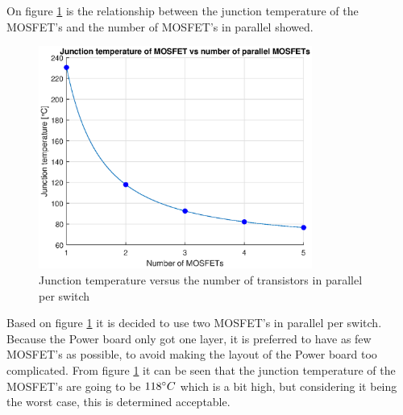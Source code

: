 On figure \ref{fig:junctionTemp} is the relationship between the junction temperature of the MOSFET's and the number of MOSFET's in parallel showed. 

    \begin{figure}[H]
		\centering
		\includegraphics[width=0.8\textwidth]{pictures/hardware/Power_Board/Juntion_temp.eps}
		\caption{Junction temperature versus the number of transistors in parallel per switch}
		\label{fig:junctionTemp}
	\end{figure}

Based on figure \ref{fig:junctionTemp} it is decided to use two MOSFET's in parallel per switch. Because the Power board only got one layer, it is preferred to have as few MOSFET's as possible, to avoid making the layout of the Power board too complicated. From figure \ref{fig:junctionTemp} it can be seen that the junction temperature of the MOSFET's are going to be $118 \degree C$ which is a bit high, but considering it being the worst case, this is determined acceptable.